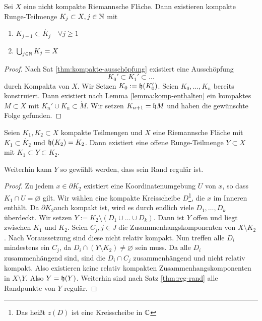 \begin{cor}
  \label{cor:ausschöpfung-kompakt}
  Sei $X$ eine nicht kompakte Riemannsche Fläche. Dann existieren
  kompakte Runge-Teilmenge $K_j \subset X, j \in \mathbb{N}$ mit
  \begin{enumerate}
  \item $K_{j-1} \subset \mathring{K_j} \quad \forall j \geq 1$
  \item $\bigcup_{j\in \mathbb{N}} K_j = X$
  \end{enumerate}
\end{cor}

\begin{proof}
  Nach Sat \ref{thm:kompakte-ausschöpfung} existiert eine 
  Ausschöpfung
  \[
  K_0' \subset K_1' \subset \dots
  \]
  durch Kompakta von $X$. Wir Setzen $K_0 := \mathfrak{h}(K_0')$. Seien
  $K_0, \dots, K_n$ bereits konstruiert. Dann existiert nach Lemma
  \ref{lemma:komp-enthalten} ein
  kompaktes $M \subset X$ mit $K_n' \cup K_n \subset \mathring
  M$. Wir setzen $K_{n+1} = \mathfrak{h}{M}$ und haben die gewünschte Folge
  gefunden.
\end{proof}

\begin{lemma}
  \label{lemma:zwischen-runge}
  Seien $K_1, K_2 \subset X$ kompakte Teilmengen und $X$ eine
  Riemannsche Fläche mit $K_1 \subset \mathring{K_2}$ und $\mathfrak{h}(K_2)
  = K_2$.
  Dann existiert eine offene Runge-Teilmenge $Y \subset X$ mit $K_1
  \subset Y \subset K_2$.

  Weiterhin kann $Y$ so gewählt werden, dass sein Rand regulär ist.
\end{lemma}

\begin{proof}
  Zu jedem $x \in \partial K_2$ existiert eine Koordinatenumgebung $U$
  von $x$, so dass $K_1 \cap U = \varnothing$ gilt. Wir wählen eine kompakte
  Kreisscheibe $D$\footnote{Das heißt $z(D)$ ist eine Kreisscheibe in
    $\mathbb{C}$}, die $x$ im Inneren enthält. Da $\partial K_2$auch
  kompakt ist, wird es durch endlich viele $D_1, \dots, D_k$
  überdeckt. Wir setzen $Y := K_2 \setminus (D_1 \cup \dots \cup D_k)$. 
  Dann ist $Y$ offen und liegt zwischen $K_1$ und $K_2$. 
  Seien $C_j, j \in J$ die Zusammenhangskomponenten von $X \setminus
  K_2$. Nach Voraussetzung sind diese nicht relativ kompakt. Nun
  treffen alle $D_i$ mindestens ein $C_j$, da $D_i \cap (Y \setminus
  K_2) \neq \varnothing$ sein muss. Da alle $D_i$ zusammenhängend
  sind, sind die $D_i \cap C_j$ zusammenhängend und nicht relativ
  kompakt. Also existieren keine relativ kompakten
  Zusammenhangskomponenten in $X\setminus Y$. Also $Y = \mathfrak{h}(Y)$.
  Weiterhin sind nach Satz \ref{thm:reg-rand} alle Randpunkte von $Y$ regulär.
\end{proof}


